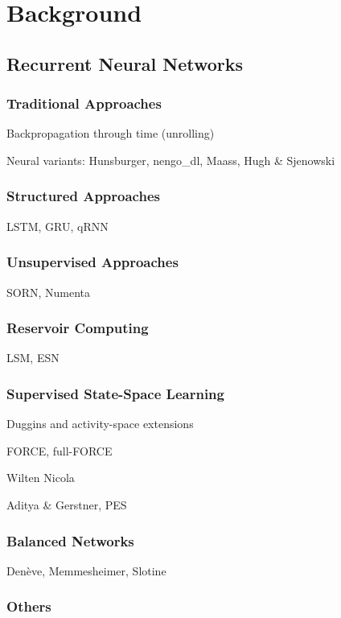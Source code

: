 \chapter{Background}
\label{chapt:background}

\section{Recurrent Neural Networks}

\subsection{Traditional Approaches}

Backpropagation through time (unrolling)

Neural variants: Hunsburger, nengo\_dl, Maass, Hugh \& Sjenowski

\subsection{Structured Approaches}

LSTM, GRU, qRNN

\subsection{Unsupervised Approaches}

SORN, Numenta

\subsection{Reservoir Computing}

LSM, ESN

\subsection{Supervised State-Space Learning}

Duggins and activity-space extensions

FORCE, full-FORCE

Wilten Nicola

Aditya \& Gerstner, PES

\subsection{Balanced Networks}

Den\`eve, Memmesheimer, Slotine

\subsection{Others}

